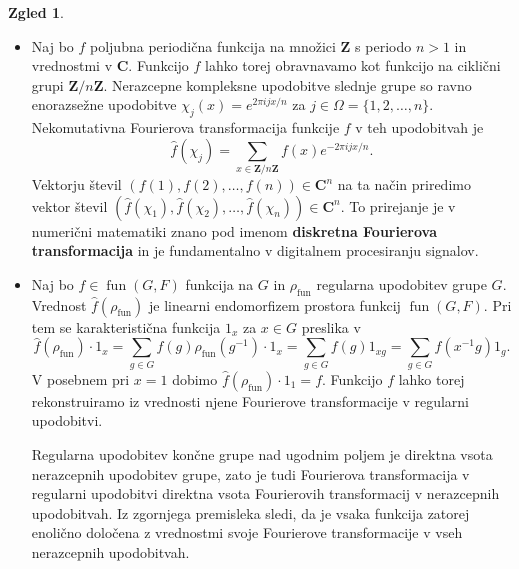 \documentclass[11pt]{book}
\def\ZZ{\mathbf{Z}}
\def\CC{\mathbf{C}}
\DeclareMathOperator\fun{fun}
\def\definicija{\color{rdeca}\bf}
\theoremstyle{definition}
\theoremstyle{zgled}
\newtheorem{zgled}[theorem]{Zgled}
\theoremstyle{zgledbrezstevilke}
\theoremstyle{odprtproblem}
\theoremstyle{domacanaloga}
\theoremstyle{izrek}
\begin{document}
\begin{zgled} \leavevmode
\begin{itemize}
    \item Naj bo $f$ poljubna periodična funkcija na množici $\ZZ$ s periodo $n > 1$ in vrednostmi v $\CC$. Funkcijo $f$ lahko torej obravnavamo kot funkcijo na ciklični grupi $\ZZ/n\ZZ$. Nerazcepne kompleksne upodobitve slednje grupe so ravno enorazsežne upodobitve $\chi_j(x) = e^{2 \pi i j x / n}$ za $j \in \Omega = \{ 1, 2, \dots, n \}$. Nekomutativna Fourierova transformacija funkcije $f$ v teh upodobitvah je
    \[
        \hat{f}(\chi_j) = \sum_{x \in \ZZ/n\ZZ} f(x) e^{- 2 \pi i j x / n }.
    \]
    Vektorju števil $(f(1), f(2), \dots, f(n)) \in \CC^n$ na ta način priredimo vektor števil $(\hat{f}(\chi_1), \hat{f}(\chi_2), \dots, \hat{f}(\chi_n)) \in \CC^n$. To prirejanje je v numerični matematiki znano pod imenom {\definicija diskretna Fourierova transformacija} in je fundamentalno v digitalnem procesiranju signalov.

    \item Naj bo $f \in \fun(G,F)$ funkcija na $G$ in $\rho_{\fun}$ regularna upodobitev grupe $G$. Vrednost $\hat{f}(\rho_{\fun})$ je linearni endomorfizem prostora funkcij $\fun(G,F)$. Pri tem se karakteristična funkcija $1_x$ za $x \in G$ preslika v
\[
    \hat{f}(\rho_{\fun}) \cdot 1_x 
    = \sum_{g \in G} f(g) \rho_{\fun}(g^{-1}) \cdot 1_x
    = \sum_{g \in G} f(g) 1_{xg}
    = \sum_{g \in G} f(x^{-1}g) 1_{g}.
\] 
V posebnem pri $x = 1$ dobimo $\hat{f}(\rho_{\fun}) \cdot 1_1 = f$. Funkcijo $f$ lahko torej rekonstruiramo iz vrednosti njene Fourierove transformacije v regularni upodobitvi. 

Regularna upodobitev končne grupe nad ugodnim poljem je direktna vsota nerazcepnih upodobitev grupe, zato je tudi Fourierova transformacija v regularni upodobitvi direktna vsota Fourierovih transformacij v nerazcepnih upodobitvah. Iz zgornjega premisleka sledi, da je vsaka funkcija zatorej enolično določena z vrednostmi svoje Fourierove transformacije v vseh nerazcepnih upodobitvah.
\end{itemize}
\end{zgled}
\end{document}
